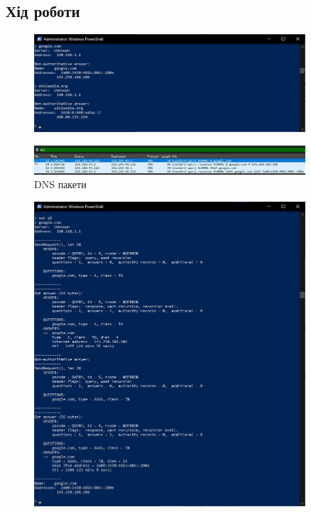 \documentclass[12pt]{extarticle}
\begin{document}
\subsection*{Хід роботи}

\begin{figure}[H]
    \centering
    \includegraphics[width=0.90\textwidth]{ip}
    \caption{}
\end{figure}


\begin{figure}[H]
    \centering
    \includegraphics[width=0.90\textwidth]{wireshark}
    \caption{DNS пакети}
\end{figure}

\begin{figure}[H]
    \centering
    \includegraphics[width=0.90\textwidth]{ipd2}
    \caption{}
\end{figure}
\end{document}
